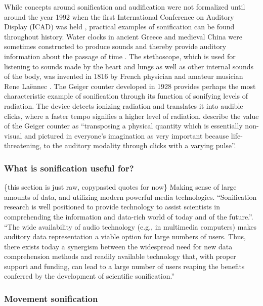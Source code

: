 \documentclass[10pt,a4paper,onecolumn]{article}
\begin{document}
While concepts around sonification and audification were not formalized until around the year 1992 when the first International Conference on Auditory Display (ICAD) was held \autocite{dubusSonificationPhysicalQuantities2011}, practical examples of sonification can be found throughout history. Water clocks in ancient Greece and medieval China were sometimes constructed to produce sounds and thereby provide auditory information about the passage of time \autocite{dubusSonificationPhysicalQuantities2011}. The stethoscope, which is used for listening to sounds made by the heart and lungs as well as other internal sounds of the body, was invented in 1816 by French physician and amateur musician Rene Laënnec \autocite{roguinReneTheophileHyacinthe2006}. The Geiger counter developed in 1928 provides perhaps the most characteristic example of sonification through its function of sonifying levels of radiation. The device detects ionizing radiation and translates it into audible clicks, where a faster tempo signifies a higher level of radiation. \textcite{dubusSonificationPhysicalQuantities2011} describe the value of the Geiger counter as ``transposing a physical quantity which is essentially non-visual and pictured in everyone's imagination as very important because life-threatening, to the auditory modality through clicks with a varying pulse''.

\hypertarget{what-is-sonification-useful-for}{%
\subsubsection{What is sonification useful for?}\label{what-is-sonification-useful-for}}

\{this section is just raw, copypasted quotes for now\}
Making sense of large amounts of data, and utilizing modern powerful media technologies. ``Sonification research is well positioned to provide technology to assist scientists in comprehending the information and data-rich world of today and of the future.''. ``The wide availability of audio technology (e.g., in multimedia computers) makes auditory data representation a viable option for large numbers of users. Thus, there exists today a synergism between the widespread need for new data comprehension methods and readily available technology that, with proper support and funding, can lead to a large number of users reaping the benefits conferred by the development of scientific sonification.'' \autocite{kramerSonificationReportStatus1999}

\hypertarget{movement-sonification}{%
\subsubsection{Movement sonification}\label{movement-sonification}}
\end{document}
